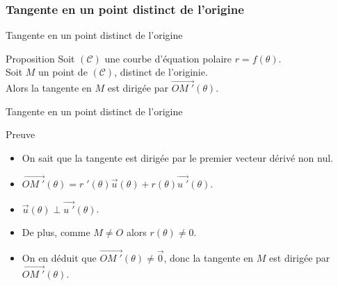 \documentclass[14pt]{beamer}
\begin{document}
\subsubsection{Tangente en un point distinct de l'origine}
\begin{frame}{Tangente en un point distinct de l'origine}
        \begin{alertblock}{Proposition}
                Soit $(\mathcal{C})$ une courbe d'équation polaire $r=f(\theta)$.\\
                Soit $M$ un point de $(\mathcal{C})$, distinct de l'originie.\\
                Alors la tangente en $M$ est dirigée par $\vec{OM\;'}(\theta)$.
        \end{alertblock}
\end{frame}
\begin{frame}{Tangente en un point distinct de l'origine}
        \begin{block}{Preuve}
                \begin{itemize}
                                \item<1-> On sait que la tangente est dirigée par le premier
                                        vecteur dérivé non nul.\\
                                \item<2-> $\vec{OM\;'}(\theta) = r\;'(\theta)\vec{u}(\theta)
                                        +r(\theta)\vec{u\;'}(\theta)$.
                                \item<3-> $\vec{u}(\theta)\perp\vec{u\;'}(\theta)$.\\
                                \item<4-> De plus, comme $M\ne O$ alors $r(\theta)\ne 0$.
                                \item<5-> On en déduit que $\vec{OM\;'}(\theta)\ne\vec{0}$, donc
                                        la tangente en $M$ est dirigée par $\vec{OM\;'}(\theta)$.


\end{itemize}
\end{block}
\end{frame}
\end{document}
